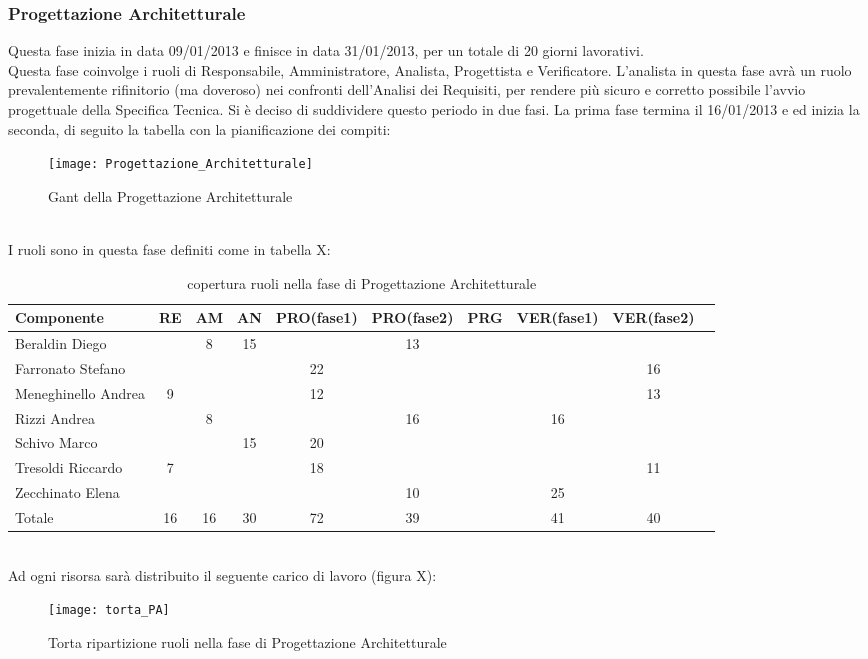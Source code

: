 \subsubsection{Progettazione Architetturale}
Questa fase inizia in data 09/01/2013 e finisce in data 31/01/2013, per un totale di 20 giorni lavorativi. \\
Questa fase coinvolge i ruoli di Responsabile, Amministratore, Analista, Progettista e Verificatore.
L'analista in questa fase avrà un ruolo prevalentemente rifinitorio (ma doveroso) nei confronti dell'Analisi dei Requisiti, per rendere più sicuro e corretto possibile l'avvio progettuale della Specifica Tecnica.
Si è deciso di suddividere questo periodo in due fasi. La prima fase termina il 16/01/2013 e ed inizia la seconda, di seguito la tabella con la pianificazione dei compiti:\\
\begin{figure}[h]
  \texttt{[image: Progettazione\_Architetturale]}
\caption{Gant della Progettazione Architetturale }
\end{figure}\\
I ruoli sono in questa fase definiti come in tabella X:\\
\begin{table}[h]
\centering
\begin{tabular}{|l|c|c|c|c|c|c|c|cl|}
\hline
Componente& RE& AM& AN& PRO(fase1)& PRO(fase2)& PRG& VER(fase1)& VER(fase2)& \\
\hline
Beraldin Diego & & 8& 15& & 13& & & &\\
Farronato Stefano & & & & 22& & & & 16&\\
Meneghinello Andrea & 9& & & 12& & & & 13&\\
Rizzi Andrea & & 8& & & 16& & 16& &\\
Schivo Marco & & & 15& 20& & & & &\\
Tresoldi Riccardo & 7& & & 18& & & & 11&\\
Zecchinato Elena & & & & & 10& & 25& &\\
\hline
Totale & 16& 16& 30& 72& 39& & 41& 40&\\
\hline
\end{tabular}
\caption{copertura ruoli nella fase di Progettazione Architetturale}
\end{table}\\
Ad ogni risorsa sarà distribuito il seguente carico di lavoro (figura X):\\
\begin{figure}[h]
  \texttt{[image: torta\_PA]}
\caption{Torta ripartizione ruoli nella fase di Progettazione Architetturale}
\end{figure}\\
